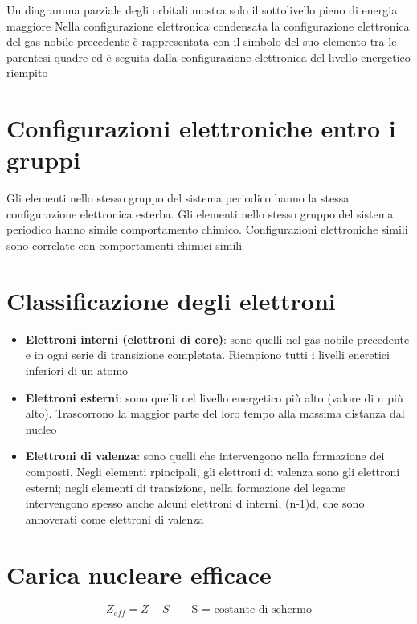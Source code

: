 \documentclass[a4paper,11pt]{report}
\begin{document}
Un diagramma parziale degli orbitali mostra solo il sottolivello pieno di energia maggiore \newline
Nella configurazione elettronica condensata la configurazione elettronica del gas nobile precedente è rappresentata con il simbolo del suo elemento tra le parentesi quadre ed è seguita dalla configurazione elettronica del livello energetico riempito

\section{Configurazioni elettroniche entro i gruppi}

Gli elementi nello stesso gruppo del sistema periodico hanno la stessa configurazione elettronica esterba. Gli elementi nello stesso gruppo del sistema periodico hanno simile comportamento chimico. 
Configurazioni elettroniche simili sono correlate con comportamenti chimici simili

\section{Classificazione degli elettroni}

\begin{itemize}
	\item \textbf{Elettroni interni (elettroni di core)}: sono quelli nel gas nobile precedente e in ogni serie di transizione completata. Riempiono tutti i livelli eneretici inferiori di un atomo
	\item \textbf{Elettroni esterni}: sono quelli nel livello energetico più alto (valore di n più alto). Trascorrono la maggior parte del loro tempo alla massima distanza dal nucleo
	\item \textbf{Elettroni di valenza}: sono quelli che intervengono nella formazione dei composti. Negli elementi rpincipali, gli elettroni di valenza sono gli elettroni esterni; negli elementi di transizione, nella formazione del legame intervengono spesso anche alcuni elettroni d interni, (n-1)d, che sono annoverati come elettroni di valenza
\end{itemize}

\section{Carica nucleare efficace}

\begin{equation*}
	Z_{eff} = Z - S \qquad \text{S = costante di schermo}
\end{equation*}
\end{document}
